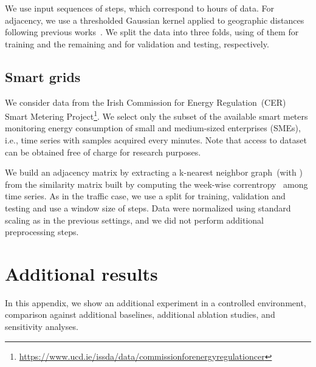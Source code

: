 \documentclass{article} \usepackage{iclr2022_conference,times}
\begin{document}
We use input sequences of  steps, which correspond to  hours of data. For adjacency, we use a thresholded Gaussian kernel applied to geographic distances following previous works~\cite{wu2019graph}. We split the data into three folds, using  of them for training and the remaining  and  for validation and testing, respectively.

\subsection{Smart grids}

We consider data from the Irish Commission for Energy Regulation~(CER) Smart Metering Project\footnote{\url{https://www.ucd.ie/issda/data/commissionforenergyregulationcer}}. We select only the subset of the available smart meters monitoring energy consumption of small and medium-sized enterprises (SMEs), i.e.,  time series with samples acquired every  minutes. Note that access to dataset can be obtained free of charge for research purposes.

We build an adjacency matrix by extracting a k-nearest neighbor graph~(with ) from the similarity matrix built by computing the week-wise correntropy~\citep{liu2007correntropy} among time series. As in the traffic case, we use a  split for training, validation and testing and use a window size of  steps. Data were normalized using standard scaling as in the previous settings, and we did not perform additional preprocessing steps.

\section{Additional results}
\label{sec:appendix_exp}
In this appendix, we show an additional experiment in a controlled environment, comparison against additional baselines, additional ablation studies, and sensitivity analyses.
\end{document}

